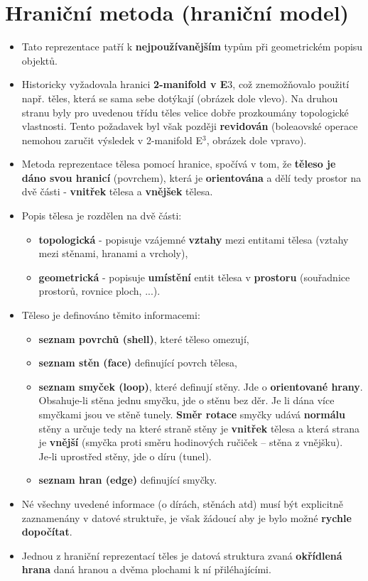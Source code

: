 \section{Hraniční metoda (hraniční model)}
\begin{itemize}
    \item Tato reprezentace patří k \textbf{nejpoužívanějším} typům při geometrickém popisu objektů.
    \item Historicky vyžadovala hranici \textbf{2-manifold v E$3$}, což znemožňovalo použití např. těles, která se sama sebe dotýkají (obrázek dole vlevo). Na druhou stranu byly pro uvedenou třídu těles velice dobře prozkoumány topologické vlastnosti. Tento požadavek byl však později \textbf{revidován} (boleaovské operace nemohou zaručit výsledek v 2-manifold E$^3$, obrázek dole vpravo).
    \item Metoda reprezentace tělesa pomocí hranice, spočívá v tom, že \textbf{těleso je dáno svou hranicí} (povrchem), která je \textbf{orientována} a dělí tedy prostor na dvě části - \textbf{vnitřek} tělesa a \textbf{vnějšek} tělesa.
    \item Popis tělesa je rozdělen na dvě části:
          \begin{itemize}
              \item \textbf{topologická} - popisuje vzájemné \textbf{vztahy} mezi entitami tělesa (vztahy mezi stěnami, hranami a vrcholy),
              \item \textbf{geometrická} - popisuje \textbf{umístění} entit tělesa v \textbf{prostoru} (souřadnice prostorů, rovnice ploch, ...).
          \end{itemize}
    \item Těleso je definováno těmito informacemi:
          \begin{itemize}
              \item	\textbf{seznam povrchů (shell)}, které těleso omezují,
              \item	\textbf{seznam stěn (face)} definující povrch tělesa,
              \item	\textbf{seznam smyček (loop)}, které definují stěny. Jde o \textbf{orientované hrany}. Obsahuje-li stěna jednu smyčku, jde o stěnu bez děr. Je li dána více smyčkami jsou ve stěně tunely. \textbf{Směr rotace} smyčky udává \textbf{normálu} stěny a určuje tedy na které straně stěny je \textbf{vnitřek} tělesa a která strana je \textbf{vnější} (smyčka proti směru hodinových ručiček – stěna z vnějšku). Je‑li uprostřed stěny, jde o díru (tunel).
              \item	\textbf{seznam hran (edge)} definující smyčky.
          \end{itemize}
    \item Né všechny uvedené informace (o dírách, stěnách atd) musí být explicitně zaznamenány v datové struktuře, je však žádoucí aby je bylo možné \textbf{rychle dopočítat}.
    \item Jednou z hraniční reprezentací těles je datová struktura zvaná \textbf{okřídlená hrana} daná hranou a dvěma plochami k ní přiléhajícími.
\end{itemize}

